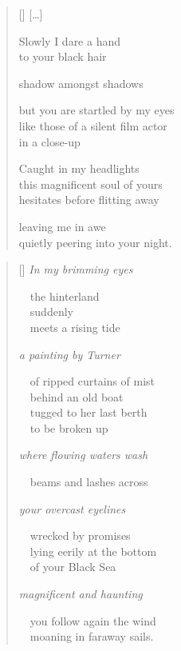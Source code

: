 \documentclass[14pt]{extbook}
\newcommand*{\centeredornament}{\centerline{\pgfornament[width=6cm]{88}}}
\begin{document}
\newpage

\vspace*{-15mm}
\centeredornament
\vspace*{-7mm}

\poemtitle*{\phantom{XV}}

\settowidth{\versewidth}{but you are startled by my eyes}

\begin{verse}[\versewidth]
  \textnormal{[\ldots]}

  Slowly I dare a hand \\
  to your black hair

  shadow amongst shadows

  but you are startled by my eyes \\
  like those of a silent film actor \\
  in a close-up

  Caught in my headlights \\
  this magnificent soul of yours \\
  hesitates before flitting away

  leaving me in awe \\
  quietly peering into your night.
\end{verse}


\newpage

\vspace*{-15mm}
\centeredornament
\vspace*{-7mm}


\settowidth{\versewidth}{\ \ you follow again the wind}

\begin{verse}[\versewidth]
  \emph{In my brimming eyes}

  \ \ the hinterland \\
  \ \ suddenly \\
  \ \ meets a rising tide

  \emph{a painting by Turner}

  \ \ of ripped curtains of mist \\
  \ \ behind an old boat \\
  \ \ tugged to her last berth \\
  \ \ to be broken up

  \emph{where flowing waters wash}

  \ \ beams and lashes across

  \emph{your overcast eyelines}

  \ \ wrecked by promises \\
  \ \ lying eerily at the bottom \\
  \ \ of your Black Sea

  \emph{magnificent and haunting}

  \ \ you follow again the wind \\
  \ \ moaning in faraway sails.
\end{verse}
\end{document}
